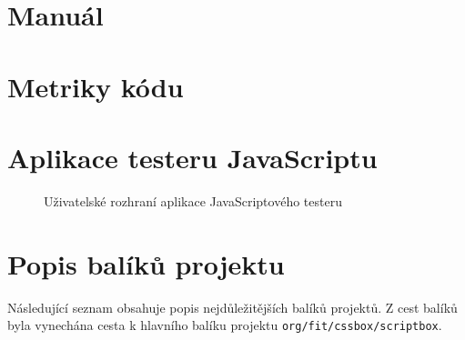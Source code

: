 \chapter{Manuál}
\label{Annex.manual}

\chapter{Metriky kódu}
\label{Annex.metrics}

\chapter{Aplikace testeru JavaScriptu}
\label{Annex.JavaScriptTester}

\begin{figure}[H]
  \begin{center}
    \caption{Uživatelské rozhraní aplikace JavaScriptového testeru}
    \label{Figure.JavaScriptTester}
  \end{center}
\end{figure}

\chapter{Popis balíků projektu}
\label{Annex.packageDescription}

Následující seznam obsahuje popis nejdůležitějších balíků projektů. Z cest balíků byla vynechána 
cesta k hlavního balíku projektu \texttt{org/fit/cssbox/scriptbox}.

